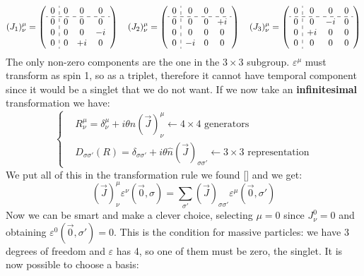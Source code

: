 \documentclass[../main.tex]{subfiles}
\begin{document}
\[
(J_1)^\mu_\nu=\left(\begin{array}{c:ccc}
    0 & 0 & 0 & 0 \\
    \hdashline
    0 & 0 & 0 & 0 \\
    0 & 0 & 0 & -i \\
    0 & 0 & +i & 0 \\
\end{array}\right)
\quad 
(J_2)^\mu_\nu=\left(\begin{array}{c:ccc}
    0 & 0 & 0 & 0 \\
    \hdashline
    0 & 0 & 0 & +i \\
    0 & 0 & 0 & 0 \\
    0 & -i & 0 & 0 \\
\end{array}\right)
\quad 
(J_3)^\mu_\nu=\left(\begin{array}{c:ccc}
    0 & 0 & 0 & 0 \\
    \hdashline
    0 & 0 & -i & 0 \\
    0 & +i & 0 & 0 \\
    0 & 0 & 0 & 0 \\
\end{array}\right)
\]
The only non-zero components are the one in the $3\times3$ subgroup. $\varepsilon^\mu$ must transform as spin 1, so as a triplet, therefore it cannot have temporal component since it would be a singlet that we do not want. If we now take an \textbf{infinitesimal} transformation we have:
\[
\left\{
\begin{aligned}
&R^\mu_\nu=\delta^\mu_\nu+i\theta\hat{n}(\vec{J})^\mu_\nu\xleftarrow[]{}\text{$4\times4$ generators}\\
&D_{\sigma\sigma'}(R)=\delta_{\sigma\sigma'}+i\theta\hat{n}(\vec{J})_{\sigma\sigma'}\xleftarrow[]{}\text{$3\times3$ representation}
\end{aligned}
\right.
\]
We put all of this in the transformation rule we found [] and we get:
\[
(\vec{J})^\mu_\nu\varepsilon^\nu(\Vec{0},\sigma)=\sum_{\sigma'}(\vec{J})_{\sigma\sigma'}\varepsilon^\mu(\Vec{0},\sigma')
\]
Now we can be smart and make a clever choice, selecting $\mu=0$ since $J^0_\nu=0$ and obtaining $\varepsilon^0(\Vec{0},\sigma')=0$. This is the condition for massive particles: we have 3 degrees of freedom and $\varepsilon$ has 4, so one of them must be zero, the singlet. It is now possible to choose a basis:
\end{document}

